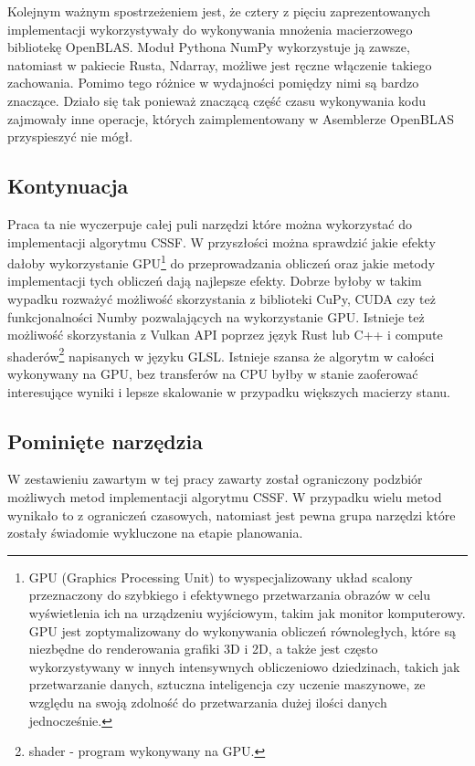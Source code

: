 \documentclass[11pt, a4paper]{article}
\begin{document}
\begin{sloppypar}
    Kolejnym ważnym spostrzeżeniem jest, że cztery z pięciu zaprezentowanych implementacji
    wykorzystywały do wykonywania mnożenia macierzowego bibliotekę OpenBLAS. Moduł
    Pythona NumPy wykorzystuje ją zawsze, natomiast w pakiecie Rusta, Ndarray, możliwe jest
    ręczne włączenie takiego zachowania. Pomimo tego różnice w wydajności pomiędzy nimi
    są bardzo znaczące. Działo się tak ponieważ znaczącą część czasu wykonywania kodu zajmowały
    inne operacje, których zaimplementowany w Asemblerze OpenBLAS przyspieszyć nie mógł.

    \subsection{Kontynuacja}
    Praca ta nie wyczerpuje całej puli narzędzi które można wykorzystać do implementacji
    algorytmu CSSF. W przyszłości można sprawdzić jakie efekty dałoby wykorzystanie GPU\footnote{GPU
    (Graphics Processing Unit) to wyspecjalizowany układ scalony przeznaczony do
    szybkiego i efektywnego przetwarzania obrazów w celu wyświetlenia ich na urządzeniu
    wyjściowym, takim jak monitor komputerowy. GPU jest zoptymalizowany do wykonywania
    obliczeń równoległych, które są niezbędne do renderowania grafiki 3D i 2D, a także
    jest często wykorzystywany w innych intensywnych obliczeniowo dziedzinach, takich jak
    przetwarzanie danych, sztuczna inteligencja czy uczenie maszynowe, ze względu na swoją
    zdolność do przetwarzania dużej ilości danych jednocześnie.} do przeprowadzania obliczeń
    oraz jakie metody implementacji tych obliczeń dają najlepsze efekty. Dobrze byłoby w
    takim wypadku rozważyć możliwość skorzystania z biblioteki CuPy, CUDA czy też funkcjonalności
    Numby pozwalających na wykorzystanie GPU. Istnieje też możliwość skorzystania z
    Vulkan API poprzez język Rust lub C++ i compute shaderów\footnote{shader - program wykonywany
    na GPU.} napisanych w języku GLSL. Istnieje szansa że algorytm w całości wykonywany
    na GPU, bez transferów na CPU byłby w stanie zaoferować interesujące wyniki i lepsze
    skalowanie w przypadku większych macierzy stanu.

    \subsection{Pominięte narzędzia}
    W zestawieniu zawartym w tej pracy zawarty został ograniczony podzbiór możliwych metod
    implementacji algorytmu CSSF. W przypadku wielu metod wynikało to z ograniczeń
    czasowych, natomiast jest pewna grupa narzędzi które zostały świadomie wykluczone na
    etapie planowania.


\end{sloppypar}
\end{document}
